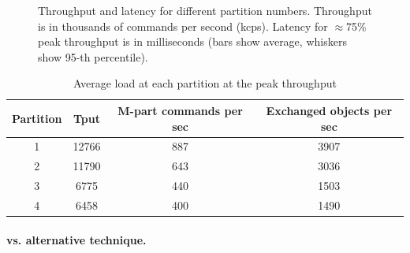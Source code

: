 \begin{figure}[h!]
\begin{subfigure}{.38\textwidth}
  \end{subfigure}
  \caption{Throughput and latency for different partition numbers. 
  Throughput is in thousands of commands per second (kcps). 
  Latency for $\approx$75\% peak throughput is in milliseconds (bars show average, whiskers show 95-th percentile).}
  \label{fig:socialscalability}
\end{figure}

\begin{table}[htp]
\caption{Average load at each partition at the peak throughput}
\begin{adjustbox}{max width=\columnwidth}
\vspace{10mm}
\begin{tabular}{|c|c|c|c|}
\hline
Partition & Tput & M-part commands per sec & Exchanged objects per sec \\ \hline
1         & 12766      & 887                      & 3907              \\ \hline
2         & 11790      & 643                      & 3036              \\ \hline
3         & 6775       & 440                      & 1503              \\ \hline
4         & 6458       & 400                      & 1490              \\ \hline
\end{tabular}
\vspace{10mm}
\end{adjustbox}
\end{table}




\paragraph*{\dynastar vs. alternative technique.}
\label{sec:evaluation:results}

